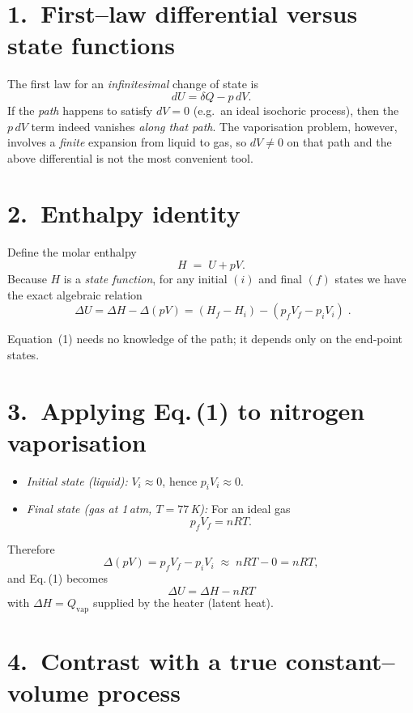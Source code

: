 \documentclass[12pt]{article}
\theoremstyle{definition} %
\theoremstyle{plain} %
\begin{document}
\section*{1.\ First--law differential versus state functions}

The first law for an \emph{infinitesimal} change of state is  
\[
dU = \delta Q - p\,dV .
\]
If the \emph{path} happens to satisfy $dV = 0$ (e.g.\ an ideal
isochoric process), then the $p\,dV$ term indeed vanishes \emph{along
that path}.  The vaporisation problem, however, involves a
\emph{finite} expansion from liquid to gas, so $dV \neq 0$ on that
path and the above differential is not the most convenient tool.

\bigskip
\section*{2.\ Enthalpy identity}

Define the molar enthalpy
\[
H \;=\; U + pV .
\]
Because $H$ is a \emph{state function}, for any initial $(i)$ and final
$(f)$ states we have the exact algebraic relation
\[
\boxed{\;
  \Delta U
  = \Delta H - \Delta(pV)
  = (H_f - H_i) - (p_fV_f - p_iV_i)
\;}.
\tag{1}
\]

Equation~(1) needs no knowledge of the path; it depends only on the
end‑point states.

\bigskip
\section*{3.\ Applying Eq.\,(1) to nitrogen vaporisation}

\begin{itemize}
  \item \emph{Initial state (liquid):}\quad
        $V_i \approx 0$, hence $p_i V_i \approx 0$.
  \item \emph{Final state (gas at 1\,atm, $T=77$\,K):}\quad
        For an ideal gas
        \[
          p_fV_f = nRT .
        \]
\end{itemize}

Therefore
\[
\Delta(pV) = p_fV_f - p_iV_i \;\approx\; nRT - 0 = nRT ,
\]
and Eq.\,(1) becomes
\[
\boxed{\;
  \Delta U = \Delta H - nRT
\;}
\]
with $\Delta H = Q_{\text{vap}}$ supplied by the heater (latent heat).

\bigskip
\section*{4.\ Contrast with a true constant--volume process}
\end{document}
